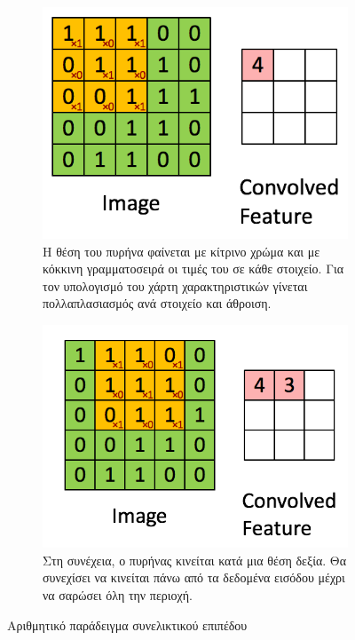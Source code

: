 \begin{figure}[H]
	\centering
	\label{fig:convolution_example}
	\begin{subfigure}[h]{0.45\textwidth}
		\centering
		\includegraphics[width=\textwidth]{images/appendix/convolution_1.png}
		\caption{Η θέση του πυρήνα φαίνεται με κίτρινο χρώμα και με κόκκινη γραμματοσειρά οι τιμές του σε κάθε στοιχείο. Για τον υπολογισμό του χάρτη χαρακτηριστικών γίνεται πολλαπλασιασμός ανά στοιχείο και άθροιση.}
	\end{subfigure}
	\hfill
	\begin{subfigure}[h]{0.45\textwidth}
		\centering
		\includegraphics[width=\textwidth]{images/appendix/convolution_2.png}
		\caption{Στη συνέχεια, ο πυρήνας κινείται κατά μια θέση δεξία. Θα συνεχίσει να κινείται πάνω από τα δεδομένα εισόδου μέχρι να σαρώσει όλη την περιοχή.}
	\end{subfigure}
	\caption{Αριθμητικό παράδειγμα συνελικτικού επιπέδου}
\end{figure}

